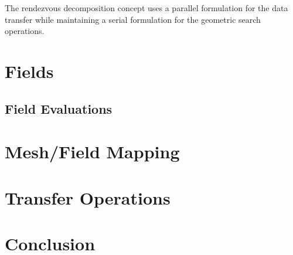 \documentclass[letterpaper]{article}
\begin{document}
The rendezvous decomposition concept uses a parallel formulation for
the data transfer while maintaining a serial formulation for the
geometric search operations.

\section{Fields}

\subsection{Field Evaluations}

\section{Mesh/Field Mapping}

\section{Transfer Operations}

\section{Conclusion}

\pagebreak


\end{document}
